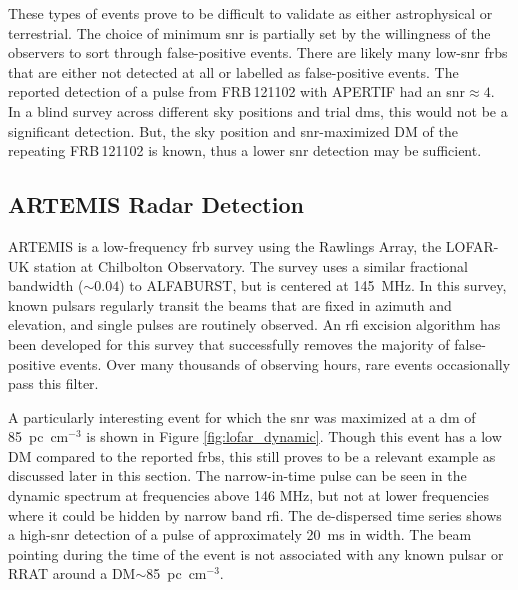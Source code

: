 \documentclass[a4paper,fleqn,usenatbib]{mnras}
\begin{document}
These types of events prove to be difficult to validate as either astrophysical
or terrestrial. The choice of minimum \gls{snr} is partially set by the
willingness of the observers to sort through false-positive events.  There are
likely many low-\gls{snr} \glspl{frb} that are either not detected at all or
labelled as false-positive events.  The reported detection of a pulse from
FRB\,121102 with APERTIF \citep{atel10693} had an \gls{snr}$\approx 4$. In a blind
survey across different sky positions and trial \glspl{dm}, this would not be a
significant detection.  But, the sky position and \gls{snr}-maximized DM of the
repeating FRB\,121102 is known, thus a lower \gls{snr} detection may be
sufficient.

\subsection{ARTEMIS Radar Detection}
\label{sec:LOFAR_RADAR}

ARTEMIS \citep{2015MNRAS.452.1254K} is a low-frequency \gls{frb} survey using
the Rawlings Array, the LOFAR-UK station at Chilbolton Observatory.  The survey
uses a similar fractional bandwidth ($\sim 0.04$) to ALFABURST, but is centered
at 145~MHz.  In this survey, known pulsars regularly transit the beams that are
fixed in azimuth and elevation, and single pulses are routinely observed.  An
\gls{rfi} excision algorithm has been developed for this survey that
successfully removes the majority of false-positive events. Over many thousands
of observing hours, rare events occasionally pass this filter.

A particularly interesting event for which the \gls{snr} was maximized at a
\gls{dm} of 85~pc~cm$^{-3}$ is shown in Figure \ref{fig:lofar_dynamic}. Though
this event has a low DM compared to the reported \glspl{frb}, this still proves
to be a relevant example as discussed later in this section.  The narrow-in-time
pulse can be seen in the dynamic spectrum at frequencies above 146 MHz, but not
at lower frequencies where it could be hidden by narrow band \gls{rfi}.  The
de-dispersed time series shows a high-\gls{snr} detection of a pulse of
approximately 20~ms in width.  The beam pointing during the time of the event is
not associated with any known pulsar or RRAT around a DM$\sim$85~pc~cm$^{-3}$.
\end{document}

